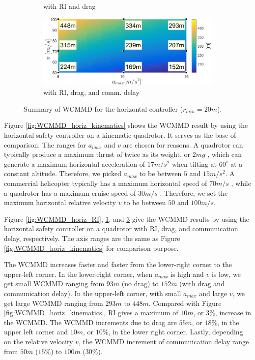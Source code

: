 \documentclass[journal,11pt,onecolumn,draftclsnofoot,]{IEEEtran}
\begin{document}
\begin{figure}
\begin{subfigure}{.45\columnwidth}
		\caption{with RI and drag}
		\label{fig:WCMMD_horiz_RI_drag}
	\end{subfigure}%
	\hfill
	\begin{subfigure}{.45\columnwidth}\centering
		\includegraphics[width=\columnwidth]{WCMMD_horizontal_RI_drag_delay}
		\caption{with RI, drag, and comm. delay}
		\label{fig:WCMMD_horiz_RI_drag_delay}
	\end{subfigure}%
	\caption{Summary of WCMMD for the horizontal controller ($r_{min}=20m$).}
\end{figure}

Figure \ref{fig:WCMMD_horiz_kinematics} shows the WCMMD result by using the horizontal safety controller on a kinematic quadrotor. It serves as the base of comparison. The ranges for $a_{max}$ and $v$ are chosen for reasons. A quadrotor can typically produce a maximum thrust of twice as its weight, or $2mg$ \cite{quad_design}, which can generate a maximum horizontal acceleration of $17m/s^2$ when tilting at $60^{\circ}$ at a constant altitude. Therefore, we picked $a_{max}$ to be between $5$ and $15m/s^2$. A commercial helicopter typically has a maximum horizontal speed of $70m/s$ \cite{helicopter_common_speed}, while a quadrotor has a maximum cruise speed of $30m/s$ \cite{quadrotor_common_speed}. Therefore, we set the maximum horizontal relative velocity $v$ to be between $50$ and $100m/s$.

Figure \ref{fig:WCMMD_horiz_RI}, \ref{fig:WCMMD_horiz_RI_drag}, and \ref{fig:WCMMD_horiz_RI_drag_delay} give the WCMMD results by using the horizontal safety controller on a quadrotor with RI, drag, and communication delay, respectively. The axis ranges are the same as Figure \ref{fig:WCMMD_horiz_kinematics} for comparison purpose.

The WCMMD increases faster and faster from the lower-right corner to the upper-left corner. In the lower-right corner, when $a_{max}$ is high and $v$ is low, we get small WCMMD ranging from $93 m$ (no drag) to $152 m$ (with drag and communication delay). In the upper-left corner, with small $a_{max}$ and large $v$, we get large WCMMD ranging from $293 m$ to $448 m$. Compared with Figure \ref{fig:WCMMD_horiz_kinematics}, RI gives a maximum of $10 m$, or $3\%$, increase in the WCMMD. The WCMMD increments due to drag are $55 m$, or $18\%$, in the upper left corner and $10 m$, or $10\%$, in the lower right corner. Lastly, depending on the relative velocity $v$, the WCMMD increment of communication delay range from $50 m$ ($15\%$) to $100 m$ ($30\%$).
\end{document}
